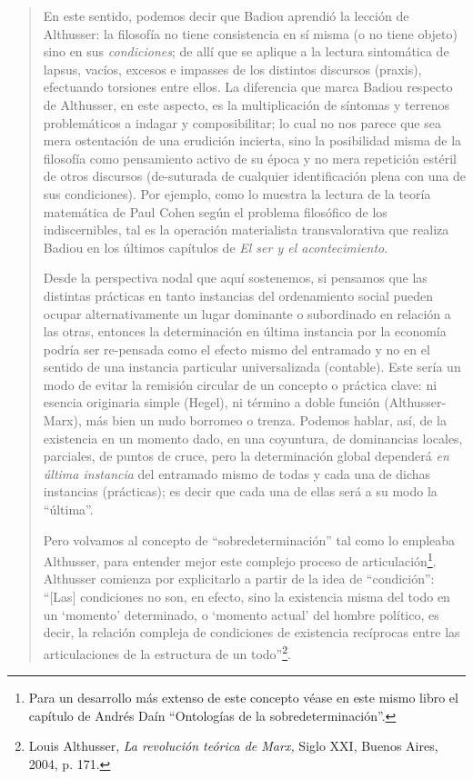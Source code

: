 \begin{quote}
En este sentido, podemos decir que Badiou aprendió la lección de Althusser: la filosofía no tiene consistencia en sí misma (o no tiene objeto) sino en sus \emph{condiciones}; de allí que se aplique a la lectura sintomática de lapsus, vacíos, excesos e impasses de los distintos discursos (praxis), efectuando torsiones entre ellos. La diferencia que marca Badiou respecto de Althusser, en este aspecto, es la multiplicación de síntomas y terrenos problemáticos a indagar y composibilitar; lo cual no nos parece que sea mera ostentación de una erudición incierta, sino la posibilidad misma de la filosofía como pensamiento activo de su época y no mera repetición estéril de otros discursos (de-suturada de cualquier identificación plena con una de sus condiciones). Por ejemplo, como lo muestra la lectura de la teoría matemática de Paul Cohen según el problema filosófico de los indiscernibles, tal es la operación materialista transvalorativa que realiza Badiou en los últimos capítulos de \emph{El ser y el acontecimiento}.

Desde la perspectiva nodal que aquí sostenemos, si pensamos que las distintas prácticas en tanto instancias del ordenamiento social pueden ocupar alternativamente un lugar dominante o subordinado en relación a las otras, entonces la determinación en última instancia por la economía podría ser re-pensada como el efecto mismo del entramado  y no en el sentido de una instancia particular universalizada (contable). Este sería un modo de evitar la remisión circular de un concepto o práctica clave: ni esencia originaria simple (Hegel), ni término a doble función (Althusser-Marx), más bien un nudo borromeo o trenza. Podemos hablar, así, de la existencia en un momento dado, en una coyuntura, de dominancias locales, parciales, de puntos de cruce, pero la determinación global dependerá \emph{en última instancia} del entramado mismo de todas y cada una de dichas instancias (prácticas); es decir que cada una de ellas será a su modo la \enquote{última}.

Pero volvamos al concepto de \enquote{sobredeterminación} tal como lo empleaba Althusser, para entender mejor este complejo proceso de articulación\footnote{Para un desarrollo más extenso de este concepto véase en este mismo libro el capítulo de Andrés Daín \enquote{Ontologías de la sobredeterminación}.}. Althusser comienza por explicitarlo a partir de la idea de \enquote{condición}: \enquote{{[}Las{]} condiciones no son, en efecto, sino la existencia misma del todo en un \enquote{momento} determinado, o \enquote{momento actual} del hombre político, es decir, la relación compleja de condiciones de existencia recíprocas entre las articulaciones de la estructura de un todo}\footnote{Louis Althusser, \emph{La revolución teórica de Marx,} Siglo XXI, Buenos Aires, 2004, p. 171.}.


\end{quote}
